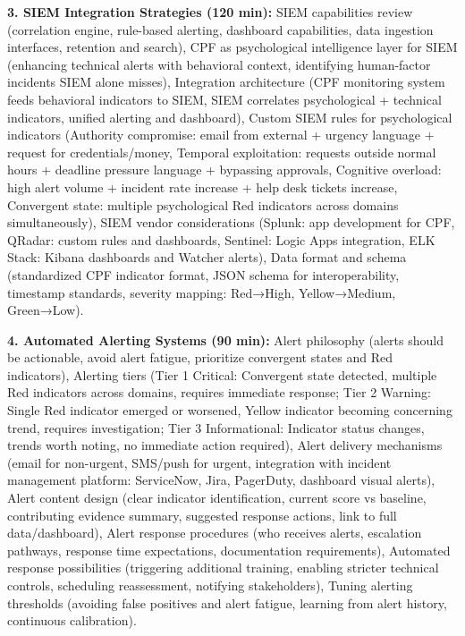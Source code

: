\documentclass[11pt,a4paper]{article}
\begin{document}
\textbf{3. SIEM Integration Strategies (120 min):} SIEM capabilities review (correlation engine, rule-based alerting, dashboard capabilities, data ingestion interfaces, retention and search), CPF as psychological intelligence layer for SIEM (enhancing technical alerts with behavioral context, identifying human-factor incidents SIEM alone misses), Integration architecture (CPF monitoring system feeds behavioral indicators to SIEM, SIEM correlates psychological + technical indicators, unified alerting and dashboard), Custom SIEM rules for psychological indicators (Authority compromise: email from external + urgency language + request for credentials/money, Temporal exploitation: requests outside normal hours + deadline pressure language + bypassing approvals, Cognitive overload: high alert volume + incident rate increase + help desk tickets increase, Convergent state: multiple psychological Red indicators across domains simultaneously), SIEM vendor considerations (Splunk: app development for CPF, QRadar: custom rules and dashboards, Sentinel: Logic Apps integration, ELK Stack: Kibana dashboards and Watcher alerts), Data format and schema (standardized CPF indicator format, JSON schema for interoperability, timestamp standards, severity mapping: Red→High, Yellow→Medium, Green→Low).

\textbf{4. Automated Alerting Systems (90 min):} Alert philosophy (alerts should be actionable, avoid alert fatigue, prioritize convergent states and Red indicators), Alerting tiers (Tier 1 Critical: Convergent state detected, multiple Red indicators across domains, requires immediate response; Tier 2 Warning: Single Red indicator emerged or worsened, Yellow indicator becoming concerning trend, requires investigation; Tier 3 Informational: Indicator status changes, trends worth noting, no immediate action required), Alert delivery mechanisms (email for non-urgent, SMS/push for urgent, integration with incident management platform: ServiceNow, Jira, PagerDuty, dashboard visual alerts), Alert content design (clear indicator identification, current score vs baseline, contributing evidence summary, suggested response actions, link to full data/dashboard), Alert response procedures (who receives alerts, escalation pathways, response time expectations, documentation requirements), Automated response possibilities (triggering additional training, enabling stricter technical controls, scheduling reassessment, notifying stakeholders), Tuning alerting thresholds (avoiding false positives and alert fatigue, learning from alert history, continuous calibration).
\end{document}
